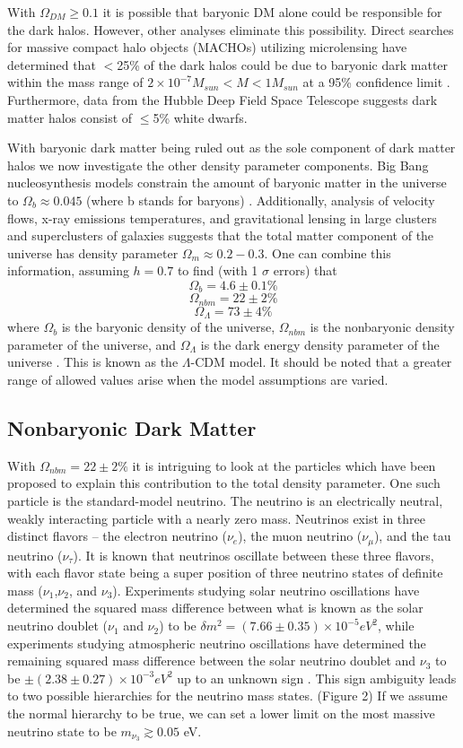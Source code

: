 \documentclass[a4paper,12pt]{article}
\begin{document}
With $\Omega_{DM} \geq 0.1$ it is possible that baryonic DM alone could be responsible for the dark halos.  However, other analyses eliminate this possibility. Direct searches for massive compact halo objects (MACHOs) utilizing microlensing have determined that $<$25\% of the dark halos could be due to baryonic dark matter within the mass range of $ 2 \times 10^{-7} M_{sun} < M < 1 M_{sun} $ at a 95\% confidence limit \cite{EROS,Alcock}. Furthermore, data from the Hubble Deep Field Space Telescope suggests dark matter halos consist of $\leq$5\% white dwarfs.

With baryonic dark matter being ruled out as the sole component of dark matter halos we now investigate the other density parameter components. Big Bang nucleosynthesis models constrain the amount of baryonic matter in the universe to $\Omega_b \approx 0.045$ (where b stands for baryons) \cite{Tytler}.  Additionally, analysis of velocity flows, x-ray emissions temperatures, and gravitational lensing in large clusters and superclusters of galaxies suggests that the total matter component of the universe has density parameter $\Omega_m \approx 0.2-0.3$.  One can combine this information, assuming $h=0.7$ to find (with 1 $\sigma$ errors) that
\[\Omega_b = 4.6 \pm 0.1\% \]
\[\Omega_{nbm} = 22 \pm 2\% \]
\[\Omega_\Lambda =73 \pm 4\% \]
where $\Omega_b$ is the baryonic density of the universe, $\Omega_{nbm}$ is the nonbaryonic density parameter of the universe, and $\Omega_\Lambda$ is the dark energy density parameter of the universe \cite{Spergel}. This is known as the $\Lambda$-CDM model.  It should be noted that a greater range of allowed values arise when the model assumptions are varied. 

\subsection{Nonbaryonic Dark Matter}

With $\Omega_{nbm} = 22 \pm 2 \% $ it is intriguing to look at the particles which have been proposed to explain this contribution to the total density parameter. One such particle is the standard-model neutrino.  The neutrino is an electrically neutral, weakly interacting particle with a nearly zero mass.  Neutrinos exist in three distinct flavors -- the electron neutrino ($\nu_e$), the muon neutrino ($\nu_\mu$), and the tau neutrino ($\nu_\tau$).  It is known that neutrinos oscillate between these three flavors, with each flavor state being a super position of three neutrino states of definite mass ($\nu_1$,$\nu_2$, and $\nu_3$).  Experiments studying solar neutrino oscillations have determined the squared mass difference between what is known as the solar neutrino doublet ($\nu_1$ and $\nu_2$) to be $\delta m^2 = (7.66 \pm 0.35) \times 10^{-5} eV^2$, while experiments studying atmospheric neutrino oscillations have determined the remaining squared mass difference between the solar neutrino doublet and $\nu_3$ to be $\pm (2.38 \pm 0.27) \times 10^{-3} eV^2$ up to an unknown sign \cite{Robertson}.  This sign ambiguity leads to two possible hierarchies for the neutrino mass states. (Figure 2)  If we assume the normal hierarchy to be true, we can set a lower limit on the most massive neutrino state to be $ m_{\nu_3} \gtrsim 0.05$ eV.
\end{document}
